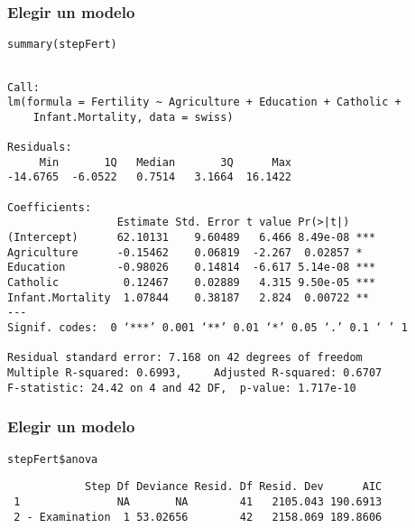\documentclass{beamer}
\begin{document}
\begin{frame}[fragile]
\frametitle{Elegir un modelo}
\label{sec-3-12}


\lstset{language=R}
\begin{lstlisting}
summary(stepFert)
\end{lstlisting}


\begin{verbatim}

Call:
lm(formula = Fertility ~ Agriculture + Education + Catholic + 
    Infant.Mortality, data = swiss)

Residuals:
     Min       1Q   Median       3Q      Max 
-14.6765  -6.0522   0.7514   3.1664  16.1422 

Coefficients:
                 Estimate Std. Error t value Pr(>|t|)    
(Intercept)      62.10131    9.60489   6.466 8.49e-08 ***
Agriculture      -0.15462    0.06819  -2.267  0.02857 *  
Education        -0.98026    0.14814  -6.617 5.14e-08 ***
Catholic          0.12467    0.02889   4.315 9.50e-05 ***
Infant.Mortality  1.07844    0.38187   2.824  0.00722 ** 
---
Signif. codes:  0 ‘***’ 0.001 ‘**’ 0.01 ‘*’ 0.05 ‘.’ 0.1 ‘ ’ 1 

Residual standard error: 7.168 on 42 degrees of freedom
Multiple R-squared: 0.6993,     Adjusted R-squared: 0.6707 
F-statistic: 24.42 on 4 and 42 DF,  p-value: 1.717e-10
\end{verbatim}
\end{frame}
\begin{frame}[fragile]
\frametitle{Elegir un modelo}
\label{sec-3-13}


\lstset{language=R}
\begin{lstlisting}
stepFert$anova
\end{lstlisting}

\begin{verbatim}
            Step Df Deviance Resid. Df Resid. Dev      AIC
 1               NA       NA        41   2105.043 190.6913
 2 - Examination  1 53.02656        42   2158.069 189.8606
\end{verbatim}
\end{frame}
\end{document}
